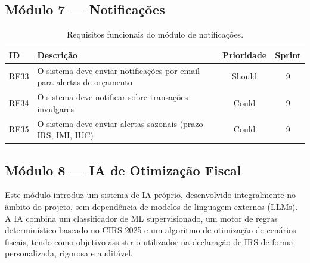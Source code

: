 \subsection{Módulo 7 --- Notificações}

\begin{table}[H]
\centering
\caption{Requisitos funcionais do módulo de notificações.}
\label{tab:rf-notif}
\small
\begin{tabularx}{\textwidth}{l X c c}
\toprule
\textbf{ID} & \textbf{Descrição} & \textbf{Prioridade} & \textbf{Sprint} \\
\midrule
RF33 & O sistema deve enviar notificações por email para alertas de orçamento & Should & 9 \\
RF34 & O sistema deve notificar sobre transações invulgares & Could & 9 \\
RF35 & O sistema deve enviar alertas sazonais (prazo IRS, IMI, IUC) & Could & 9 \\
\bottomrule
\end{tabularx}
\end{table}

\subsection{Módulo 8 --- IA de Otimização Fiscal}

Este módulo introduz um sistema de \ac{IA} próprio, desenvolvido integralmente no âmbito do projeto, sem dependência de modelos de linguagem externos (\ac{LLM}s). A IA combina um classificador de \ac{ML} supervisionado, um motor de regras determinístico baseado no \ac{CIRS} 2025 e um algoritmo de otimização de cenários fiscais, tendo como objetivo assistir o utilizador na declaração de \ac{IRS} de forma personalizada, rigorosa e auditável.

